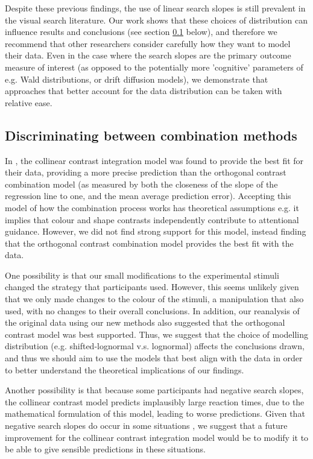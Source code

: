 \documentclass[preprint,12pt,authoryear]{elsarticle}
\begin{document}
Despite these previous findings, the use of linear search slopes is still prevalent in the visual search literature. Our work shows that these choices of distribution can influence results and conclusions (see section \ref{sec:dis_combmethods} below), and therefore we recommend that other researchers consider carefully how they want to model their data. Even in the case where the search slopes are the primary outcome measure of interest (as opposed to the potentially more 'cognitive' parameters of e.g. Wald distributions, or drift diffusion models), we demonstrate that approaches that better account for the data distribution can be taken with relative ease.


\subsection{Discriminating between combination methods}
\label{sec:dis_combmethods}

In \cite{buetti2019predicting}, the collinear contrast integration model was found to provide the best fit for their data, providing a more precise prediction than the orthogonal contrast combination model (as measured by both the closeness of the slope of the regression line to one, and the mean average prediction error). Accepting this model of how the combination process works has theoretical assumptions e.g. it implies that colour and shape contrasts independently contribute to attentional guidance. However, we did not find strong support for this model, instead finding that the orthogonal contrast combination model provides the best fit with the data.

One possibility is that our small modifications to the experimental stimuli changed the strategy that participants used. However, this seems unlikely given that we only made changes to the colour of the stimuli, a manipulation that \cite{buetti2019predicting} also used, with no changes to their overall conclusions. In addition, our reanalysis of the original \citep{buetti2019predicting} data using our new methods also suggested that the orthogonal contrast model was best supported.  Thus, we suggest that the choice of modelling distribution (e.g. shifted-lognormal v.s. lognormal) affects the conclusions drawn, and thus we should aim to use the models that best align with the data in order to better understand the theoretical implications of our findings.

Another possibility is that because some participants had negative search slopes, the collinear contrast model predicts implausibly large reaction times, due to the mathematical formulation of this model, leading to worse predictions. Given that negative search slopes do occur in some situations \citep{utochkin2013visual}, we suggest that a future improvement for the collinear contrast integration model would be to modify it to be able to give sensible predictions in these situations.
\end{document}
